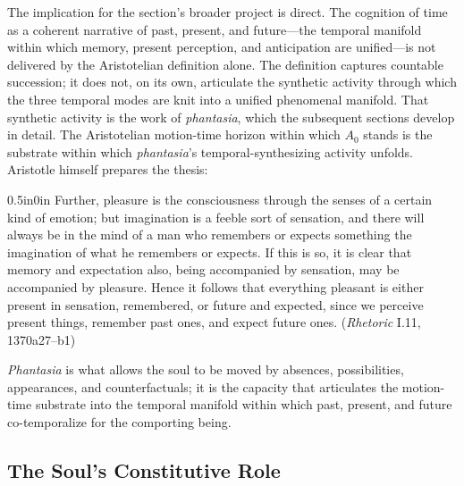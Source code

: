 \documentclass{article}
\begin{document}
The implication for the section's broader project is direct. The cognition of time as a coherent narrative of past, present, and future---the temporal manifold within which memory, present perception, and anticipation are unified---is not delivered by the Aristotelian definition alone. The definition captures countable succession; it does not, on its own, articulate the synthetic activity through which the three temporal modes are knit into a unified phenomenal manifold. That synthetic activity is the work of \textit{phantasia}, which the subsequent sections develop in detail. The Aristotelian motion-time horizon within which $A_0$ stands is the substrate within which \textit{phantasia}'s temporal-synthesizing activity unfolds. Aristotle himself prepares the thesis:
\begin{adjustwidth}{0.5in}{0in}
Further, pleasure is the consciousness through the senses of a certain kind of emotion; but imagination is a feeble sort of sensation, and there will always be in the mind of a man who remembers or expects something the imagination of what he remembers or expects. If this is so, it is clear that memory and expectation also, being accompanied by sensation, may be accompanied by pleasure. Hence it follows that everything pleasant is either present in sensation, remembered, or future and expected, since we perceive present things, remember past ones, and expect future ones. (\textit{Rhetoric} I.11, 1370a27--b1)
\end{adjustwidth}
\textit{Phantasia} is what allows the soul to be moved by absences, possibilities, appearances, and counterfactuals; it is the capacity that articulates the motion-time substrate into the temporal manifold within which past, present, and future co-temporalize for the comporting being.

\subsection{The Soul's Constitutive Role}
\end{document}
